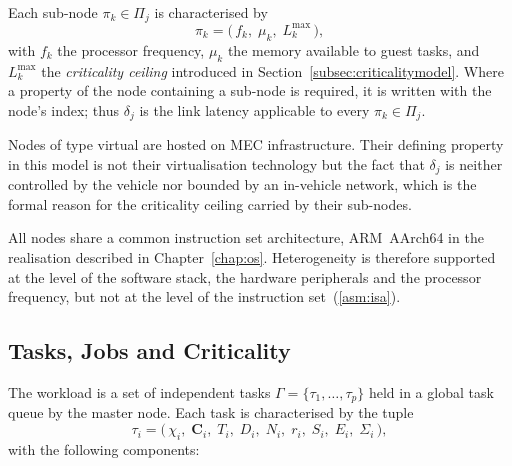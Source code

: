 Each sub-node $\pi_k \in \Pi_j$ is characterised by
%
\begin{equation}\label{eq:subnodemodel}
  \pi_k = \bigl(\,f_k,\; \mu_k,\; L_k^{\max}\,\bigr),
\end{equation}
%
with $f_k$ the processor frequency, $\mu_k$ the memory available to guest
tasks, and $L_k^{\max}$ the \emph{criticality ceiling} introduced in
Section~\ref{subsec:criticalitymodel}. Where a property of the node
containing a sub-node is required, it is written with the node's index; thus
$\delta_j$ is the link latency applicable to every $\pi_k \in \Pi_j$.

Nodes of type \textsf{virtual} are hosted on MEC infrastructure. Their
defining property in this model is not their virtualisation technology but the
fact that $\delta_j$ is neither controlled by the vehicle nor bounded by an
in-vehicle network, which is the formal reason for the criticality ceiling
carried by their sub-nodes.

All nodes share a common instruction set architecture, ARM~AArch64 in the
realisation described in Chapter~\ref{chap:os}. Heterogeneity is therefore
supported at the level of the software stack, the hardware peripherals and the
processor frequency, but not at the level of the instruction
set~(\cref{asm:isa}).

\subsection{Tasks, Jobs and Criticality}\label{subsec:taskmodel}

The workload is a set of independent tasks $\Gamma = \{\tau_1, \dots,
\tau_p\}$ held in a global task queue by the master node. Each task is
characterised by the tuple
%
\begin{equation}\label{eq:taskmodel}
	\tau_i = \bigl(\,\chi_i,\; \mathbf{C}_i,\; T_i,\; D_i,\; N_i,\; r_i,\;
	S_i,\; E_i,\; \Sigma_i \,\bigr),
\end{equation}
%
with the following components:

